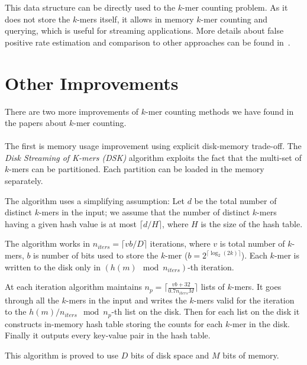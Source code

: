 This data structure can be directly used to the $k$-mer counting problem. As it does not store the $k$-mers itself, it allows in memory $k$-mer counting and querying, which is useful for streaming applications.
More details about false positive rate estimation and comparison to other approaches can be found in~\cite{khmer}.

\section{Other Improvements}

There are two more improvements of $k$-mer counting methods we have found in the papers about $k$-mer counting.

\paragraph{} The first is memory usage improvement using explicit disk-memory trade-off. The \emph{Disk Streaming of K-mers (DSK)} algorithm\cite{dsk} exploits the fact that the multi-set of $k$-mers can be partitioned. Each partition can be loaded in the memory separately.

The algorithm uses a simplifying assumption: Let $d$ be the total number of distinct $k$-mers in the input; we assume that the number of distinct $k$-mers having a given hash value is at most $\lceil d/H \rceil$, where $H$ is the size of the hash table\cite{dsk}.

The algorithm works in $n_{iters} = \lceil vb/D\rceil$ iterations, where $v$ is total number of $k$-mers, $b$ is number of bits used to store the $k$-mer ($b = 2^{\lceil\log_2(2k)\rceil}$). Each $k$-mer is written to the disk only in $(h(m) \mod n_{iters})$-th iteration.

At each iteration algorithm maintains $n_p = \lceil\frac{vb+32}{0.7n_{iters}M}\rceil$ lists of $k$-mers.
It goes through all the $k$-mers in the input and writes the $k$-mers valid for the iteration to the $h(m)/n_{iters} \mod n_p$-th list on the disk.
Then for each list on the disk it constructs in-memory hash table storing the counts for each $k$-mer in the disk.
Finally it outputs every key-value pair in the hash table.

This algorithm is proved to use $D$ bits of disk space and $M$ bits of memory\cite{dsk}.


